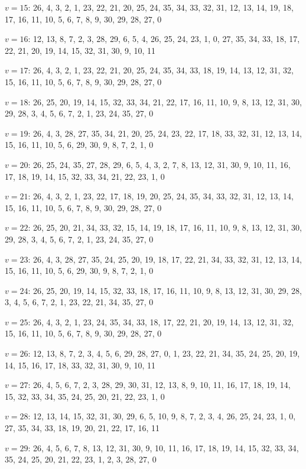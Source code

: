 \documentclass{amcjoucc}
\begin{document}
\begin{itemize}
{\item $v = 15$: 26, 4, 3, 2, 1, 23, 22, 21, 20, 25, 24, 35, 34, 33, 32, 31, 12, 13, 14, 19, 18, 17, 16, 11, 10, 5, 6, 7, 8, 9, 30, 29, 28, 27, 0
\item $v = 16$: 12, 13, 8, 7, 2, 3, 28, 29, 6, 5, 4, 26, 25, 24, 23, 1, 0, 27, 35, 34, 33, 18, 17, 22, 21, 20, 19, 14, 15, 32, 31, 30, 9, 10, 11
\item $v = 17$: 26, 4, 3, 2, 1, 23, 22, 21, 20, 25, 24, 35, 34, 33, 18, 19, 14, 13, 12, 31, 32, 15, 16, 11, 10, 5, 6, 7, 8, 9, 30, 29, 28, 27, 0
\item $v = 18$: 26, 25, 20, 19, 14, 15, 32, 33, 34, 21, 22, 17, 16, 11, 10, 9, 8, 13, 12, 31, 30, 29, 28, 3, 4, 5, 6, 7, 2, 1, 23, 24, 35, 27, 0
\item $v = 19$: 26, 4, 3, 28, 27, 35, 34, 21, 20, 25, 24, 23, 22, 17, 18, 33, 32, 31, 12, 13, 14, 15, 16, 11, 10, 5, 6, 29, 30, 9, 8, 7, 2, 1, 0
\item $v = 20$: 26, 25, 24, 35, 27, 28, 29, 6, 5, 4, 3, 2, 7, 8, 13, 12, 31, 30, 9, 10, 11, 16, 17, 18, 19, 14, 15, 32, 33, 34, 21, 22, 23, 1, 0
\item $v = 21$: 26, 4, 3, 2, 1, 23, 22, 17, 18, 19, 20, 25, 24, 35, 34, 33, 32, 31, 12, 13, 14, 15, 16, 11, 10, 5, 6, 7, 8, 9, 30, 29, 28, 27, 0
\item $v = 22$: 26, 25, 20, 21, 34, 33, 32, 15, 14, 19, 18, 17, 16, 11, 10, 9, 8, 13, 12, 31, 30, 29, 28, 3, 4, 5, 6, 7, 2, 1, 23, 24, 35, 27, 0
\item $v = 23$: 26, 4, 3, 28, 27, 35, 24, 25, 20, 19, 18, 17, 22, 21, 34, 33, 32, 31, 12, 13, 14, 15, 16, 11, 10, 5, 6, 29, 30, 9, 8, 7, 2, 1, 0
\item $v = 24$: 26, 25, 20, 19, 14, 15, 32, 33, 18, 17, 16, 11, 10, 9, 8, 13, 12, 31, 30, 29, 28, 3, 4, 5, 6, 7, 2, 1, 23, 22, 21, 34, 35, 27, 0
\item $v = 25$: 26, 4, 3, 2, 1, 23, 24, 35, 34, 33, 18, 17, 22, 21, 20, 19, 14, 13, 12, 31, 32, 15, 16, 11, 10, 5, 6, 7, 8, 9, 30, 29, 28, 27, 0
\item $v = 26$: 12, 13, 8, 7, 2, 3, 4, 5, 6, 29, 28, 27, 0, 1, 23, 22, 21, 34, 35, 24, 25, 20, 19, 14, 15, 16, 17, 18, 33, 32, 31, 30, 9, 10, 11
\item $v = 27$: 26, 4, 5, 6, 7, 2, 3, 28, 29, 30, 31, 12, 13, 8, 9, 10, 11, 16, 17, 18, 19, 14, 15, 32, 33, 34, 35, 24, 25, 20, 21, 22, 23, 1, 0
\item $v = 28$: 12, 13, 14, 15, 32, 31, 30, 29, 6, 5, 10, 9, 8, 7, 2, 3, 4, 26, 25, 24, 23, 1, 0, 27, 35, 34, 33, 18, 19, 20, 21, 22, 17, 16, 11
\item $v = 29$: 26, 4, 5, 6, 7, 8, 13, 12, 31, 30, 9, 10, 11, 16, 17, 18, 19, 14, 15, 32, 33, 34, 35, 24, 25, 20, 21, 22, 23, 1, 2, 3, 28, 27, 0
}
\end{itemize}
\end{document}
